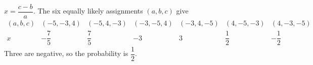 $x=\dfrac{c-b}{a}$. The six equally likely assignments $(a,b,c)$ give
\[
\begin{array}{c|cccccc}
(a,b,c)&(-5,-3,4)&(-5,4,-3)&(-3,-5,4)&(-3,4,-5)&(4,-5,-3)&(4,-3,-5)\\\hline
x&-\dfrac{7}{5}&\dfrac{7}{5}&-3&3&\dfrac{1}{2}&-\dfrac{1}{2}
\end{array}
\]
Three are negative, so the probability is $\boxed{\dfrac{1}{2}}$.
